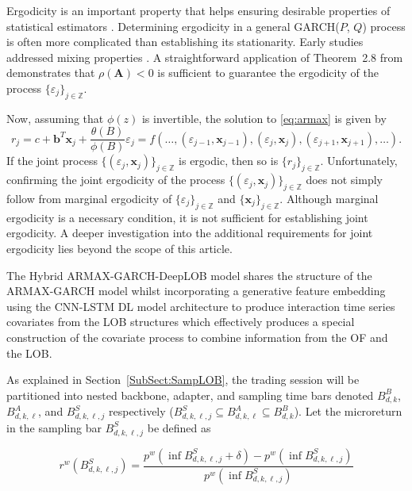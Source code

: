 \documentclass[10pt,a4paper,oneside]{article}
\newcommand{\Z}{\mathbb{Z}}
\begin{document}
Ergodicity is an important property that helps ensuring desirable properties of statistical estimators \citep[see~p.~367]{francq2019garch}. Determining ergodicity in a general GARCH(\(P\), \(Q\)) process is often more complicated than establishing its stationarity. Early studies addressed mixing properties \cite{boussama1998ergodicite, carrasco2002mixing}. A straightforward application of Theorem~2.8 from \cite{straumann_quasi-maximum-likelihood_2006} demonstrates that \(\rho(\mathbf{A}) < 0\) is sufficient to guarantee the ergodicity of the process \(\{\varepsilon_j\}_{j \in \mathbb{Z}}\).

Now, assuming that $\phi(z)$ is invertible, the solution to \eqref{eq:armax} is given by
$$
    r_j = c +  \mathbf{b}^T \mathbf{x}_j + \frac{\theta(B)}{\phi(B)} \varepsilon_j = f(\dots, (\varepsilon_{j - 1}, \mathbf{x}_{j - 1}), (\varepsilon_{j}, \mathbf{x}_{j}), (\varepsilon_{j + 1}, \mathbf{x}_{j + 1}), \dots).
$$
If the joint process $\{ (\varepsilon_j, \mathbf{x}_j) \}_{j \in \Z}$ is ergodic, then so is $\{ r_j \}_{j \in \Z}$. Unfortunately, confirming the joint ergodicity of the process \(\{(\varepsilon_j, \mathbf{x}_j)\}_{j \in \mathbb{Z}}\) does not simply follow from marginal ergodicity of \(\{\varepsilon_j\}_{j \in \mathbb{Z}}\) and \(\{\mathbf{x}_j\}_{j \in \mathbb{Z}}\). Although marginal ergodicity is a necessary condition, it is not sufficient for establishing joint ergodicity. A deeper investigation into the additional requirements for joint ergodicity lies beyond the scope of this article.

The Hybrid ARMAX-GARCH-DeepLOB model shares the structure of the ARMAX-GARCH model whilst incorporating a generative feature embedding using the CNN-LSTM DL model architecture to produce interaction time series covariates from the LOB structures which effectively produces a special construction of the covariate process to combine information from the OF and the LOB.

As explained in Section~\ref{SubSect:SampLOB}, the trading session will be partitioned into nested backbone, adapter, and sampling time bars denoted $B^B_{d,k}$, $B^A_{d,k,\ell}$, and $B^S_{d,k,\ell,j}$ respectively ($B^S_{d,k,\ell,j} \subseteq B^A_{d,k,\ell} \subseteq B^B_{d,k}$). Let the microreturn in the sampling bar $B^S_{d, k, \ell, j}$ be defined as

$$
    r^w\left( B^S_{d, k, \ell, j} \right) = \frac{p^w\left( \inf B^S_{d, k, \ell, j} + \delta \right) - p^w\left( \inf B^S_{d, k, \ell, j}\right)}{p^w\left( \inf B^S_{d, k, \ell, j}\right)}
$$
\end{document}

